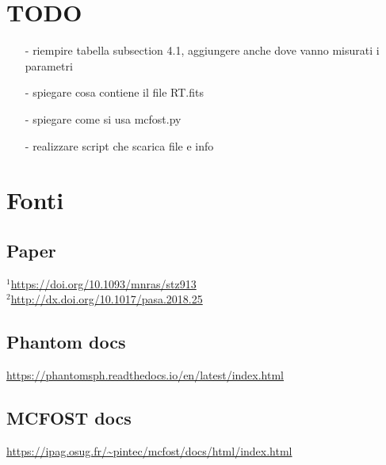 \documentclass[DIN, pagenumber=false, fontsize=11pt, parskip=half]{scrartcl}
\begin{document}
\section{TODO}
\begin{enumerate}
 \item[-] riempire tabella subsection 4.1, aggiungere anche dove vanno misurati i parametri
 \item[-] spiegare cosa contiene il file RT.fits
 \item[-] spiegare come si usa mcfost.py
 \item[-] realizzare script che scarica file e info
\end{enumerate}


\section{Fonti}

\subsection{Paper}
\label{source}
 $^1$\url{https://doi.org/10.1093/mnras/stz913} \\
 $^2$\url{http://dx.doi.org/10.1017/pasa.2018.25}
\subsection{Phantom docs}
\url{https://phantomsph.readthedocs.io/en/latest/index.html}

\subsection{MCFOST docs}
\url{https://ipag.osug.fr/~pintec/mcfost/docs/html/index.html}
\end{document}
